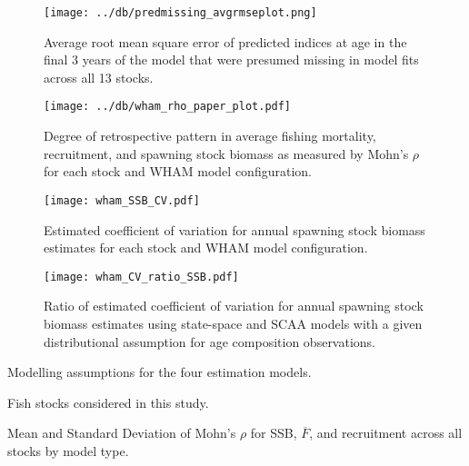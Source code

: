 \documentclass[12pt,letterpaper, leqno]{article}
\begin{document}
\begin{landscape}
\begin{figure}
\caption{Average root mean square error of predicted indices at age in the final 3 years of the model that were presumed missing in model fits across all 13 stocks.}\label{predmissing_avgrmseplot}
\begin{center}
\texttt{[image: ../db/predmissing\_avgrmseplot.png]}
\end{center}
\end{figure}

\begin{figure}
\caption{Degree of retrospective pattern in average fishing mortality, recruitment, and spawning stock biomass as measured by Mohn's $\rho$ for each stock and WHAM model configuration.}\label{wham_rho_paper_plot}
\begin{center}
\texttt{[image: ../db/wham\_rho\_paper\_plot.pdf]}
\end{center}
\end{figure}

\begin{figure}
\caption{Estimated coefficient of variation for annual spawning stock biomass estimates for each stock and WHAM model configuration.}\label{wham_SSB_CV}
\begin{center}
\texttt{[image: wham\_SSB\_CV.pdf]}
\end{center}
\end{figure}

\begin{figure}
\caption{Ratio of estimated coefficient of variation for annual spawning stock biomass estimates using state-space and SCAA models with a given distributional assumption for age composition observations.}\label{wham_SSB_CV_ratio}
\begin{center}
\texttt{[image: wham\_CV\_ratio\_SSB.pdf]}
\end{center}
\end{figure}
\end{landscape}

\clearpage


\begin{landscape}
\begin{table}
\begin{center}
\caption{Modelling assumptions for the four estimation models.}\label{assumption_models}

\end{center}
\end{table}

\begin{table}
\begin{center}
\caption{Fish stocks considered in this study.}\label{fish_stocks}

\end{center}
\end{table}

\end{landscape}

\begin{table}
\begin{center}
\caption{Mean and Standard Deviation of Mohn's $\rho$ for SSB, $\overline{F}$, and recruitment across all stocks by model type.}\label{model_compare}

\end{center}
\end{table}
\end{document}
